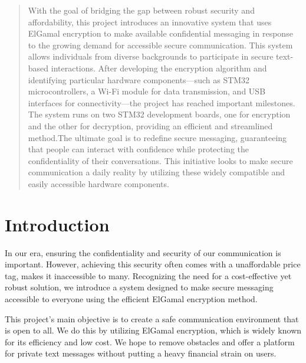 \documentclass[12pt]{article}
\begin{document}
	
	
	\renewcommand{\abstractname}{Summary}
	\begin{abstract}
		With the goal of bridging the gap between robust security and affordability, this project introduces an innovative system that uses ElGamal encryption to make available confidential messaging in response to the growing demand for accessible secure communication. This system allows individuals from diverse backgrounds to participate in secure text-based interactions. After developing the encryption algorithm and identifying particular hardware components—such as STM32 microcontrollers, a Wi-Fi module for data transmission, and USB interfaces for connectivity—the project has reached important milestones. The system runs on two STM32 development boards, one for encryption and the other for decryption, providing an efficient and streamlined method.The ultimate goal is to redefine secure messaging, guaranteeing that people can interact with confidence while protecting the confidentiality of their conversations. This initiative looks to make secure communication a daily reality by utilizing these widely compatible and easily accessible hardware components.
		
	\end{abstract}
	
	
	\clearpage %
	\section{Introduction}
	In our era, ensuring the confidentiality and security of our communication is important. However, achieving this security often comes with a unaffordable price tag, makes it inaccessible to many. Recognizing the need for a cost-effective yet robust solution, we introduce a system designed to make secure messaging accessible to everyone using the efficient ElGamal encryption method.
	
	This project's main objective is to create a safe communication environment that is open to all. We do this by utilizing ElGamal encryption, which is widely known for its efficiency and low cost. We hope to remove obstacles and offer a platform for private text messages without putting a heavy financial strain on users.
	
\end{document}
